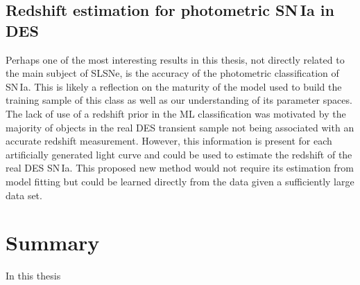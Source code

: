 \subsection{Redshift estimation for photometric SN\,Ia in DES}
Perhaps one of the most interesting results in this thesis, not directly related to the main subject of SLSNe, is the accuracy of the photometric classification of SN\,Ia. This is likely a reflection on the maturity of the model used to build the training sample of this class as well as our understanding of its parameter spaces. The lack of use of a redshift prior in the ML classification was motivated by the majority of objects in the real DES transient sample not being associated with an accurate redshift measurement. However, this information is present for each artificially generated light curve and could be used to estimate the redshift of the real DES SN\,Ia. This proposed new method would not require its estimation from model fitting but could be learned directly from the data given a sufficiently large data set.

\section{Summary}
In this thesis

